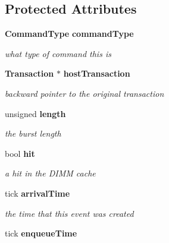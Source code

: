 \subsection*{Protected Attributes}
\begin{DoxyCompactItemize}
\item 
{\bf CommandType} {\bf commandType}\label{class_d_r_a_msim_i_i_1_1_command_ad9c96c151b429f1a6ae4f4f1f0bb6976}

\begin{DoxyCompactList}\small\item\em what type of command this is \item\end{DoxyCompactList}\item 
{\bf Transaction} $\ast$ {\bf hostTransaction}\label{class_d_r_a_msim_i_i_1_1_command_a97b111d32b69123034865baeceef2755}

\begin{DoxyCompactList}\small\item\em backward pointer to the original transaction \item\end{DoxyCompactList}\item 
unsigned {\bf length}\label{class_d_r_a_msim_i_i_1_1_command_ac1361b967fa7530dd8d3ef02dca9b30f}

\begin{DoxyCompactList}\small\item\em the burst length \item\end{DoxyCompactList}\item 
bool {\bf hit}\label{class_d_r_a_msim_i_i_1_1_command_a9125588bca5f2a288b32d3b552ab7b54}

\begin{DoxyCompactList}\small\item\em a hit in the DIMM cache \item\end{DoxyCompactList}\item 
tick {\bf arrivalTime}\label{class_d_r_a_msim_i_i_1_1_event_a5eae270c205a02b2fb28d11ab84a6ed9}

\begin{DoxyCompactList}\small\item\em the time that this event was created \item\end{DoxyCompactList}\item 
tick {\bf enqueueTime}\label{class_d_r_a_msim_i_i_1_1_event_a55cd17fa82ce4031824037df59dc50d3}


\end{DoxyCompactItemize}
